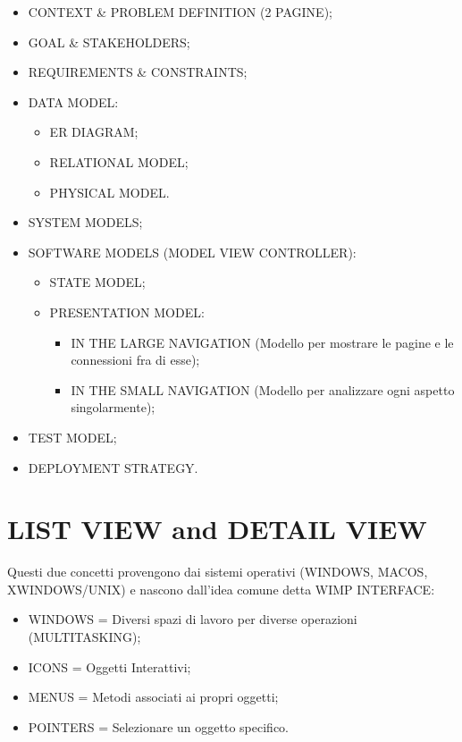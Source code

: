 \begin{itemize}

\item CONTEXT \& PROBLEM DEFINITION (2 PAGINE);
\item GOAL \& STAKEHOLDERS;
\item REQUIREMENTS \& CONSTRAINTS;  
\item DATA MODEL:

\begin{itemize}

\item ER DIAGRAM;
\item RELATIONAL MODEL;
\item PHYSICAL MODEL.

\end{itemize}

\item SYSTEM MODELS;
\item SOFTWARE MODELS (MODEL VIEW CONTROLLER):

\begin{itemize}

\item STATE MODEL;
\item PRESENTATION MODEL:

\begin{itemize}

\item IN THE LARGE NAVIGATION (Modello per mostrare le pagine e le connessioni fra di esse);
\item IN THE SMALL NAVIGATION (Modello per analizzare ogni aspetto singolarmente);
\end{itemize}
\end{itemize}
  
\item TEST MODEL;
\item DEPLOYMENT STRATEGY.

\end{itemize}

\section{LIST VIEW and DETAIL VIEW}

Questi due concetti provengono dai sistemi operativi (WINDOWS, MACOS, XWINDOWS/UNIX) e nascono dall’idea comune detta WIMP INTERFACE:

\begin{itemize}

\item WINDOWS = Diversi spazi di lavoro per diverse operazioni (MULTITASKING);
\item ICONS = Oggetti Interattivi;
\item MENUS = Metodi associati ai propri oggetti;
\item POINTERS = Selezionare un oggetto specifico.

\end{itemize}

